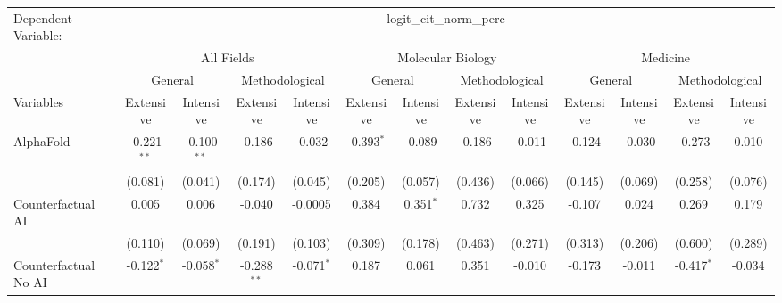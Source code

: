 \begingroup
\centering
\begin{tabular}{lcccccccccccc}
   \tabularnewline \midrule \midrule
   Dependent Variable: & \multicolumn{12}{c}{logit\_cit\_norm\_perc}\\
 & \multicolumn{4}{c}{All Fields} & \multicolumn{4}{c}{Molecular Biology} & \multicolumn{4}{c}{Medicine} \\
\cmidrule(lr){2-5} \cmidrule(lr){6-9} \cmidrule(lr){10-13}
 & \multicolumn{2}{c}{General} & \multicolumn{2}{c}{Methodological} & \multicolumn{2}{c}{General} & \multicolumn{2}{c}{Methodological} & \multicolumn{2}{c}{General} & \multicolumn{2}{c}{Methodological} \\
\cmidrule(lr){2-3} \cmidrule(lr){4-5} \cmidrule(lr){6-7} \cmidrule(lr){8-9} \cmidrule(lr){10-11} \cmidrule(lr){12-13}
Variables & \multicolumn{1}{c}{Extensive} & \multicolumn{1}{c}{Intensive} & \multicolumn{1}{c}{Extensive} & \multicolumn{1}{c}{Intensive} & \multicolumn{1}{c}{Extensive} & \multicolumn{1}{c}{Intensive} & \multicolumn{1}{c}{Extensive} & \multicolumn{1}{c}{Intensive} & \multicolumn{1}{c}{Extensive} & \multicolumn{1}{c}{Intensive} & \multicolumn{1}{c}{Extensive} & \multicolumn{1}{c}{Intensive} \\
\cmidrule(lr){1-1}\cmidrule(lr){2-2} \cmidrule(lr){3-3} \cmidrule(lr){4-4} \cmidrule(lr){5-5} \cmidrule(lr){6-6} \cmidrule(lr){7-7} \cmidrule(lr){8-8} \cmidrule(lr){9-9} \cmidrule(lr){10-10} \cmidrule(lr){11-11} \cmidrule(lr){12-12} \cmidrule(lr){13-13}
   AlphaFold                                & -0.221$^{**}$ & -0.100$^{**}$ & -0.186        & -0.032       & -0.393$^{*}$ & -0.089      & -0.186  & -0.011  & -0.124      & -0.030  & -0.273       & 0.010\\   
                                            & (0.081)       & (0.041)       & (0.174)       & (0.045)      & (0.205)      & (0.057)     & (0.436) & (0.066) & (0.145)     & (0.069) & (0.258)      & (0.076)\\   
   Counterfactual AI                        & 0.005         & 0.006         & -0.040        & -0.0005      & 0.384        & 0.351$^{*}$ & 0.732   & 0.325   & -0.107      & 0.024   & 0.269        & 0.179\\   
                                            & (0.110)       & (0.069)       & (0.191)       & (0.103)      & (0.309)      & (0.178)     & (0.463) & (0.271) & (0.313)     & (0.206) & (0.600)      & (0.289)\\   
   Counterfactual No AI                     & -0.122$^{*}$  & -0.058$^{*}$  & -0.288$^{**}$ & -0.071$^{*}$ & 0.187        & 0.061       & 0.351   & -0.010  & -0.173      & -0.011  & -0.417$^{*}$ & -0.034\\   

\end{tabular}
